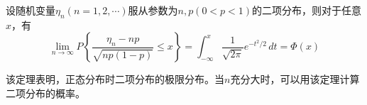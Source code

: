 \begin{theorem}
    设随机变量$\eta_n(n=1,2,\cdots)$服从参数为$n,p(0<p<1)$的二项分布，则对于任意$x$，有
    $$\lim_{n\to\infty}P\left\{   \frac{\eta_n-np}{\sqrt{np(1-p)}}\leq x\right\} =\int_{-\infty}^{x} \frac{1}{\sqrt{2\pi}} e^{-t^2/2}\,dt=\varPhi (x) $$
\end{theorem}

\begin{remark}
    该定理表明，正态分布时二项分布的极限分布。当$n$充分大时，可以用该定理计算二项分布的概率。
\end{remark}

